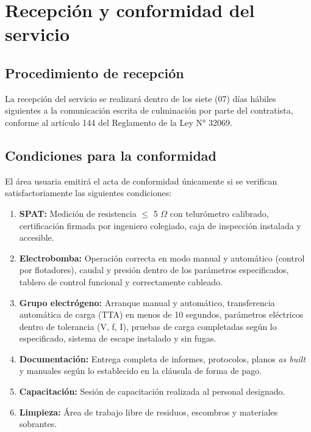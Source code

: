 \documentclass[12pt,a4paper]{article}
\begin{document}
\section{Recepción y conformidad del servicio}

\subsection{Procedimiento de recepción}

La recepción del servicio se realizará dentro de los siete (07) días hábiles siguientes a la comunicación escrita de culminación por parte del contratista, conforme al artículo 144 del Reglamento de la Ley N° 32069.

\subsection{Condiciones para la conformidad}

El área usuaria emitirá el acta de conformidad únicamente si se verifican satisfactoriamente las siguientes condiciones:

\begin{enumerate}
  \item \textbf{SPAT:} Medición de resistencia $\leq$ 5 $\Omega$ con telurómetro calibrado, certificación firmada por ingeniero colegiado, caja de inspección instalada y accesible.
  \item \textbf{Electrobomba:} Operación correcta en modo manual y automático (control por flotadores), caudal y presión dentro de los parámetros especificados, tablero de control funcional y correctamente cableado.
  \item \textbf{Grupo electrógeno:} Arranque manual y automático, transferencia automática de carga (TTA) en menos de 10 segundos, parámetros eléctricos dentro de tolerancia (V, f, I), pruebas de carga completadas según lo especificado, sistema de escape instalado y sin fugas.
  \item \textbf{Documentación:} Entrega completa de informes, protocolos, planos \emph{as built} y manuales según lo establecido en la cláusula de forma de pago.
  \item \textbf{Capacitación:} Sesión de capacitación realizada al personal designado.
  \item \textbf{Limpieza:} Área de trabajo libre de residuos, escombros y materiales sobrantes.
\end{enumerate}

\end{document}
